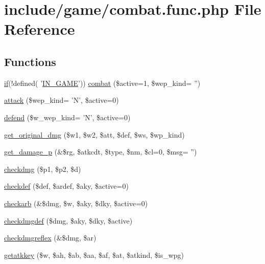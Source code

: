 \hypertarget{combat_8func_8php}{\section{include/game/combat.func.\+php File Reference}
\label{combat_8func_8php}
}
\subsection*{Functions}
\begin{DoxyCompactItemize}
\item 
\hyperlink{login__old_8php_a4ac1118c2e44c513a674bc1793ba6c90}{if}(!defined( '\hyperlink{templates_2install_8php_a12c82f3d28569a3f80804f1e72cef14c}{I\+N\+\_\+\+G\+A\+M\+E}')) \hyperlink{combat_8func_8php_ab0ece1bbb552fc6f5fad756e3dbebde1}{combat} (\$active=1, \$wep\+\_\+kind= '')
\item 
\hyperlink{combat_8func_8php_a04f372351a98edf04e2697b24bd0bb60}{attack} (\$wep\+\_\+kind= 'N', \$active=0)
\item 
\hyperlink{combat_8func_8php_a360906058274b6758cdd6ca70eef08db}{defend} (\$w\+\_\+wep\+\_\+kind= 'N', \$active=0)
\item 
\hyperlink{combat_8func_8php_a3859b3ab13abb14a7237e0a913f8dd58}{get\+\_\+original\+\_\+dmg} (\$w1, \$w2, \$att, \$def, \$ws, \$wp\+\_\+kind)
\item 
\hyperlink{combat_8func_8php_ae04a8ab670fcf1103ba43934620a28fb}{get\+\_\+damage\+\_\+p} (\&\$rg, \$atkcdt, \$type, \$nm, \$cl=0, \$msg= '')
\item 
\hyperlink{combat_8func_8php_a8c1fd08a0c1e8c56dca6144e211a6914}{checkdmg} (\$p1, \$p2, \$d)
\item 
\hyperlink{combat_8func_8php_a5204fe63006c4dfe97cc0ad9d482d401}{checkdef} (\$def, \$ardef, \$aky, \$active=0)
\item 
\hyperlink{combat_8func_8php_a3020c6aafbe122567f23e9fd2866324e}{checkarb} (\&\$dmg, \$w, \$aky, \$dky, \$active=0)
\item 
\hyperlink{combat_8func_8php_a54da043b0db510597b12a48963edeffa}{checkdmgdef} (\$dmg, \$aky, \$dky, \$active)
\item 
\hyperlink{combat_8func_8php_a3e7dc8a97465663fbb158bd529d9b255}{checkdmgreflex} (\&\$dmg, \$ar)
\item 
\hyperlink{combat_8func_8php_a1ea081dabaf1b019eaecd5c31a023d53}{getatkkey} (\$w, \$ah, \$ab, \$aa, \$af, \$at, \$atkind, \$is\+\_\+wpg)
\item 

\end{DoxyCompactItemize}
